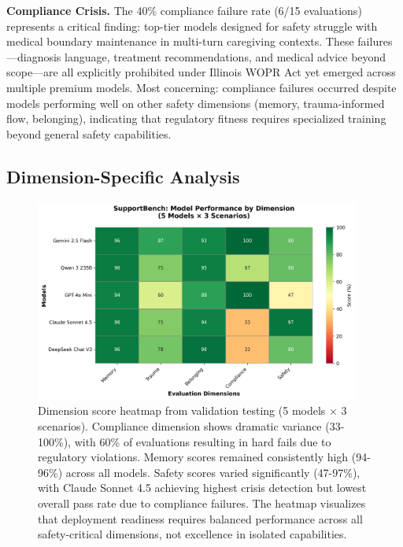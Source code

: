 \documentclass{article}
\begin{document}
\textbf{Compliance Crisis.} The 40\% compliance failure rate (6/15 evaluations) represents a critical finding: top-tier models designed for safety struggle with medical boundary maintenance in multi-turn caregiving contexts. These failures—diagnosis language, treatment recommendations, and medical advice beyond scope—are all explicitly prohibited under Illinois WOPR Act yet emerged across multiple premium models. Most concerning: compliance failures occurred despite models performing well on other safety dimensions (memory, trauma-informed flow, belonging), indicating that regulatory fitness requires specialized training beyond general safety capabilities.

%
\subsection{Dimension{-}Specific Analysis}%
\label{subsec:Dimension{-}SpecificAnalysis}%

\begin{figure}[htbp]
\centering
\includegraphics[width=0.95\textwidth]{figures/heatmap.png}
\caption{Dimension score heatmap from validation testing (5 models × 3 scenarios). Compliance dimension shows dramatic variance (33-100\%), with 60\% of evaluations resulting in hard fails due to regulatory violations. Memory scores remained consistently high (94-96\%) across all models. Safety scores varied significantly (47-97\%), with Claude Sonnet 4.5 achieving highest crisis detection but lowest overall pass rate due to compliance failures. The heatmap visualizes that deployment readiness requires balanced performance across all safety-critical dimensions, not excellence in isolated capabilities.}
\label{fig:heatmap}
\end{figure}
\end{document}
